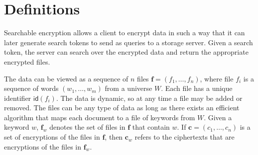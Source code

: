 \documentclass[12pt,a4paper]{article}
\theoremstyle{definition}
\begin{document}
\section{Definitions}

Searchable encryption allows a client to encrypt data in such a way that
it can later generate search tokens to send as queries to a storage
server. Given a search token, the server can search over the encrypted data
and return the appropriate encrypted files.

The data can be viewed as a sequence of \(n\) files
\(\mathbf{f} = (f_1, \dotsc, f_n)\), where file \(f_i\) is a sequence of words
\((w_1, \dotsc, w_m)\) from a universe \(W\). Each file
has a unique identifier \(\mathsf{id}(f_i)\). The data is dynamic, so at
any time a file may be added or removed. The files can be any type of data as
long as there exists an efficient algorithm that maps each document to a
file of keywords from \(W\). Given a
keyword \(w\), \(\mathbf{f}_w\) denotes the set of files in \(\mathbf{f}\)
that contain \(w\). If \(\mathbf{c} = (c_1 ,\dotsc, c_n)\) is a set of
encryptions of the files in \(\mathbf{f}\), then \(\mathbf{c}_w\) refers
to the ciphertexts that are encryptions of the files in \(\mathbf{f}_w\).
\end{document}
